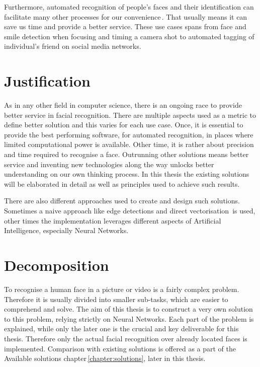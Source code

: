 Furthermore, automated recognition of people's faces and their identification can facilitate many other processes for our convenience\,\cite{ourbiometricfuture}. That usually means it can save us time and provide a better service. These use cases spans from face and smile detection when focusing and timing a camera shot to automated tagging of individual's friend on social media networks.

\section{Justification}

As in any other field in computer science, there is an ongoing race to provide better service in facial recognition. There are multiple aspects used as a metric to define better solution and this varies for each use case. Once, it is essential to provide the best performing software, for automated recognition, in places where limited computational power is available. Other time, it is rather about precision and time required to recognise a face. Outrunning other solutions means better service and inventing new technologies along the way unlocks better understanding on our own thinking process. In this thesis the existing solutions will be elaborated in detail as well as principles used to achieve such results.

There are also different approaches used to create and design such solutions. Sometimes a naive approach like edge detections and direct vectorisation\,\cite{prabhu2009facial} is used, other times the implementation leverages different aspects of Artificial Intelligence, especially Neural Networks.

\section{Decomposition}

To recognise a human face in a picture or video is a fairly complex problem. Therefore it is usually divided into smaller sub-tasks, which are easier to comprehend and solve. The aim of this thesis is to construct a very own solution to this problem, relying strictly on Neural Networks. Each part of the problem is explained, while only the later one is the crucial and key deliverable for this thesis. Therefore only the actual facial recognition over already located faces is implemented. Comparison with existing solutions is offered as a part of the Available solutions chapter\,\ref{chapter:solutions}, later in this thesis.

